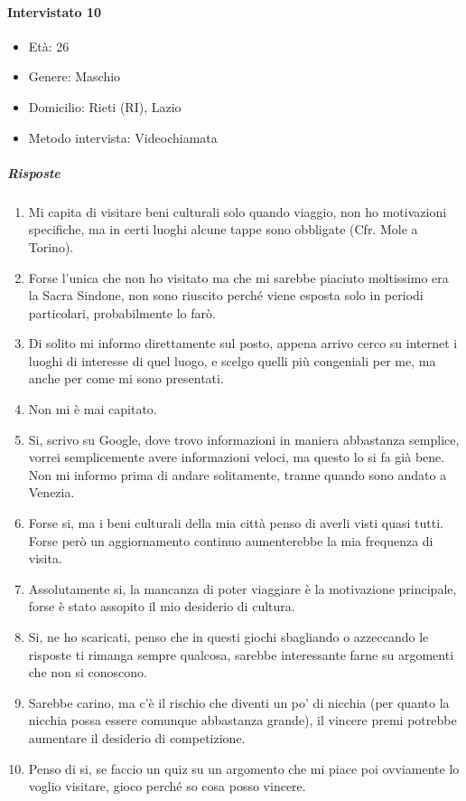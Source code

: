 \documentclass{article}
\begin{document}
\paragraph{Intervistato 10}
\begin{itemize}
\item Età: 26
\item Genere: Maschio
\item Domicilio: Rieti (RI), Lazio
\item Metodo intervista: Videochiamata
\end{itemize}
\subparagraph{Risposte}
\begin{enumerate}
\item Mi capita di visitare beni culturali solo quando viaggio, non ho motivazioni specifiche, ma in certi luoghi alcune tappe sono obbligate (Cfr. Mole a Torino).
\item Forse l’unica che non ho visitato ma che mi sarebbe piaciuto moltissimo era la Sacra Sindone, non sono riuscito perché viene esposta solo in periodi particolari, probabilmente lo farò.
\item Di solito mi informo direttamente sul posto, appena arrivo cerco su internet i luoghi di interesse di quel luogo, e scelgo quelli più congeniali per me, ma anche per come mi sono presentati.
\item Non mi è mai capitato.
\item Si, scrivo su Google, dove trovo informazioni in maniera abbastanza semplice, vorrei semplicemente avere informazioni veloci, ma questo lo si fa già bene. Non mi informo prima di andare solitamente, tranne quando sono andato a Venezia.
\item Forse si, ma i beni culturali della mia città penso di averli visti quasi tutti. Forse però un aggiornamento continuo aumenterebbe la mia frequenza di visita.
\item Assolutamente si, la mancanza di poter viaggiare è la motivazione principale, forse è stato assopito il mio desiderio di cultura.
\item Si, ne ho scaricati, penso che in questi giochi sbagliando o azzeccando le risposte ti rimanga sempre qualcosa, sarebbe interessante farne su argomenti che non si conoscono.
\item Sarebbe carino, ma c’è il rischio che diventi un po' di nicchia (per quanto la nicchia possa essere comunque abbastanza grande), il vincere premi potrebbe aumentare il desiderio di competizione.
\item Penso di si, se faccio un quiz su un argomento che mi piace poi ovviamente lo voglio visitare, gioco perché so cosa posso vincere.
\end{enumerate}
\end{document}
